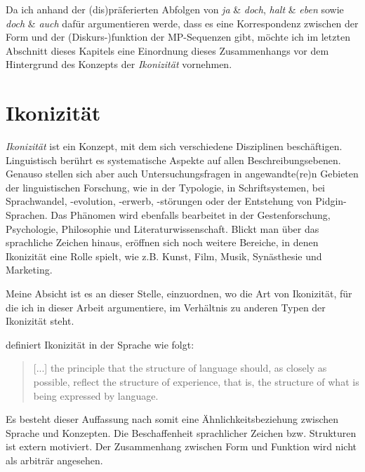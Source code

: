 \noindent 
Da ich anhand der (dis)präferierten Abfolgen von \textit{ja} \& \textit{doch}, \textit{halt} \& \textit{eben} sowie \textit{doch} \& \textit{auch} dafür argumentieren werde, dass es eine Korrespondenz zwischen der Form und der (Diskurs-)funktion der MP-Sequenzen gibt, möchte ich im letz\-ten Abschnitt dieses Kapitels eine Einordnung dieses Zusammenhangs vor dem Hintergrund des Konzepts der \textit{Ikoni\-zität}  vornehmen.

\section{Ikonizität}
\label{sec:ikonizität}
\textit{Ikonizität} ist ein Konzept, mit dem sich verschiedene Disziplinen beschäftigen. Linguistisch berührt es systematische Aspekte auf allen Beschreibungsebenen. Genauso stellen sich aber auch Untersuchungsfragen in angewandte(re)n Gebie\-ten der linguistischen Forschung, wie in  der Typologie, in  Schriftsystemen, bei  Sprachwandel,  -evolution,  -erwerb, -störungen  oder der  Entstehung von Pidgin-Sprachen. Das Phänomen wird ebenfalls bearbeitet in der Gestenforschung, Psychologie, Philosophie und Literaturwissenschaft. Blickt man über das sprachliche Zeichen hinaus, eröffnen sich noch weitere Bereiche, in denen Ikonizität eine Rolle spielt, wie z.B. Kunst, Film, Musik, Synästhesie und Marketing. 

Meine Absicht ist es an dieser Stelle, einzuordnen, wo die Art von Ikonizität, für die ich in dieser Arbeit argumentiere, im Verhältnis zu anderen Typen der Ikonizität steht. 

\citet[129]{Croft1995} definiert Ikonizität in der Sprache wie folgt:
\begin{quotation} 
[...] the principle that the structure of language should, as closely as possible, reflect the structure of experience, that is, the structure of what is being expressed by language.
\end{quotation}
Es besteht dieser Auffassung nach somit eine Ähnlichkeitsbeziehung zwischen Sprache und Konzepten. Die Beschaffenheit sprachlicher Zeichen bzw. Strukturen ist extern motiviert. Der Zusammenhang zwischen Form und Funktion wird nicht als arbiträr  angesehen.

